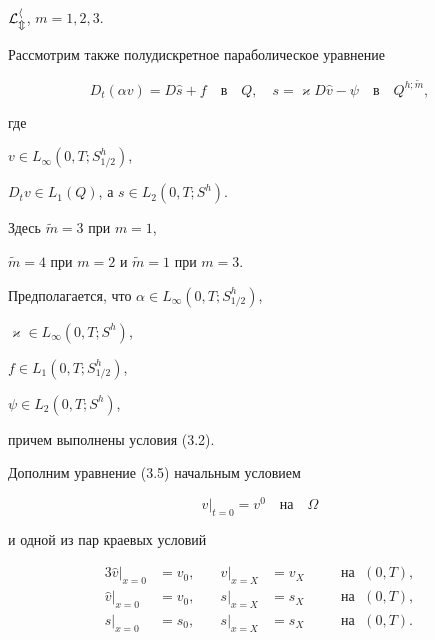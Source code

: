 $\cal L_m^h$, $m=1,2,3$.





Рассмотрим также полудискретное параболическое уравнение


\begin{equation}


D_t(\alpha v)=D\widehat s +f\quad\text{в}\quad Q,\quad


s=\varkappa D\widehat v - \psi\quad\text{в}\quad Q^{h;\widetilde m},


\end{equation}


где


$v\in L_\infty(0,T;S^h_{1/2})$,


$D_tv\in L_1(Q)$, а $s\in L_2(0,T;S^h)$.


Здесь $\widetilde m=3$ при $m=1$,


$\widetilde m=4$ при $m=2$ и $\widetilde m=1$ при $m=3$.


Предполагается, что $\alpha\in L_\infty(0,T;S^h_{1/2})$,


$\varkappa\in L_\infty(0,T;S^h)$,


$f\in L_1(0,T;S^h_{1/2})$,


$\psi\in L_2(0,T;S^h)$,


причем выполнены условия (3.2).


Дополним уравнение (3.5) начальным условием


\begin{equation}


v|_{t=0}=v^0\quad\text{на}\quad\Omega


\end{equation}


и одной из пар краевых условий


\begin{alignat}{3}


\widehat v|_{x=0}&=v_0, &\quad


\widehat v|_{x=X}&=v_X &\quad &\text {на }\; (0,T), \tag{$3.7_1$}\\


\widehat v|_{x=0}&=v_0, &\quad


s|_{x=X}&=s_X &\quad &\text {на }\; (0,T), \tag{$3.7_2$}\\


s|_{x=0}&=s_0, &\quad


s|_{x=X}&=s_X &\quad &\text {на }\; (0,T). \tag{$3.7_3$}


\end{alignat}


